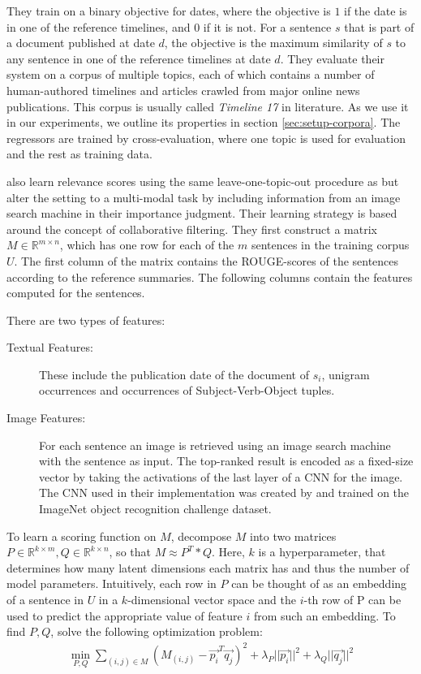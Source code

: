 \documentclass[a4paper,BCOR=10mm]{report}
\numberwithin{lemma}{chapter}
\numberwithin{definition}{chapter}
\begin{document}
They train on a binary objective for dates, where the objective is $1$ if the date is in one of the reference timelines, and $0$ if it is not.
For a sentence $s$ that is part of a document published at date $d$, the objective is the maximum similarity of $s$ to any sentence in one of the reference timelines at date $d$.
They evaluate their system on a corpus of multiple topics, each of which contains a number of human-authored timelines and articles crawled from major online news publications. This corpus is usually called \textit{Timeline 17} in literature. As we use it in our experiments, we outline its properties in section \ref{sec:setup-corpora}. The regressors are trained by cross-evaluation, where one topic is used for evaluation and the rest as training data.

\citet{multimodal} also learn relevance scores using the same leave-one-topic-out procedure as \citet{tran-tl17} but alter the setting to a multi-modal task by including information from an image search machine in their importance judgment.
Their learning strategy is based around the concept of collaborative filtering.
They first construct a matrix $M \in \mathbb{R}^{m \times n}$, which has one row for each of the $m$ sentences in the training corpus $U$. The first column of the matrix contains the ROUGE-scores of the sentences according to the reference summaries. The following columns contain the features computed for the sentences.

There are two types of features:

\begin{description}
\item[Textual Features:]{These include the publication date of the document of $s_i$, unigram occurrences and occurrences of Subject-Verb-Object tuples.}
\item[Image Features:]{For each sentence an image is retrieved using an image search machine with the sentence as input. The top-ranked result is encoded as a fixed-size vector by taking the activations of the last layer of a CNN for the image. The CNN used in their implementation was created by \citet{Simonyan+Zisserman} and trained on the ImageNet \citep{ImageNet} object recognition challenge dataset.}
\end{description}

To learn a scoring function on $M$, \citet{multimodal} decompose $M$ into two matrices $P \in \mathbb{R}^{k \times m}, Q \in \mathbb{R}^{k \times n}$, so that $M \approx P^T * Q$. Here, $k$ is a hyperparameter, that determines how many latent dimensions each matrix has and thus the number of model parameters. Intuitively, each row in $P$ can be thought of as an embedding of a sentence in $U$ in a $k$-dimensional vector space and the $i$-th row of P can be used to predict the appropriate value of feature $i$ from such an embedding.
To find $P, Q$, \citeauthor{multimodal} solve the following optimization problem:
\begin{align}
\min_{P, Q} \sum_{(i,j) \in M} (M_{(i,j)} - \vec{p_i}^T\vec{q_j})^2 + \lambda_P ||\vec{p_i}|| ^ 2 + \lambda_Q ||\vec{q_j}|| ^ 2 \label{multimodal-objective}
\end{align}
\end{document}
